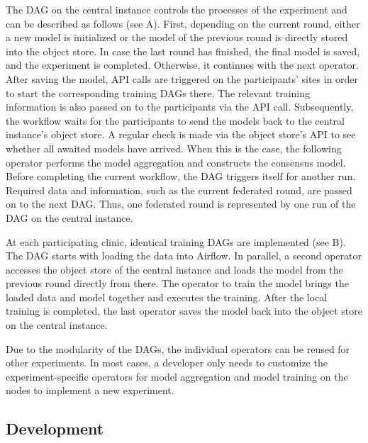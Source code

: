 The DAG on the central instance controls the processes of the experiment and can be described as follows (see  A).
First, depending on the current round, either a new model is initialized  or the model of the previous round is directly stored into the object store.
In case the last round has finished, the final model is saved, and the experiment is completed. Otherwise, it continues with the next operator.
After saving the model, API calls are triggered on the participants' sites in order to start the corresponding training DAGs there. The relevant training information is also passed on to the participants via the API call. Subsequently, the workflow waits for the participants to send the models back to the central instance's object store. A regular check is made via the object store's API to see whether all awaited models have arrived.
When this is the case, the following operator performs the model aggregation and constructs the consensus model.
Before completing the current workflow, the DAG triggers itself for another run. Required data and information, such as the current federated round, are passed on to the next DAG. Thus, one federated round is represented by one run of the DAG on the central instance.

At each participating clinic, identical training DAGs are implemented (see  B).
The DAG starts with loading the data into Airflow. In parallel, a second operator accesses the object store of the central instance and loads the model from the previous round directly from there.
The operator to train the model brings the loaded data and model together and executes the training. After the local training is completed, the last operator saves the model back into the object store on the central instance.

Due to the modularity of the DAGs, the individual operators can be reused for other experiments. In most cases, a developer only needs to customize the experiment-specific operators for model aggregation and model training on the nodes to implement a new experiment.


\subsection{Development}
\label{subsec:Development} 

